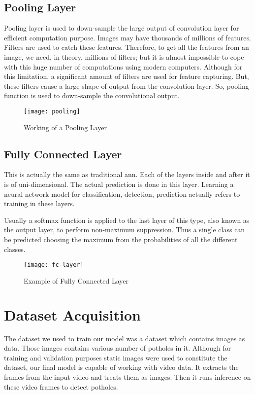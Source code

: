         \subsection{Pooling Layer}
            Pooling layer is used to down-sample the large output of convolution layer for efficient computation purpose. Images may have thousands of millions of features. Filters are used to catch these features. Therefore, to get all the features from an image, we need, in theory, millions of filters; but it is almost impossible to cope with this huge number of computations using modern computers. Although for this limitation, a significant amount of filters are used for feature capturing. But, these filters cause a large shape of output from the convolution layer. So, pooling function is used to down-sample the convolutional output.      
            \begin{figure}[h]
                \centering
                \texttt{[image: pooling]}
                \caption{Working of a Pooling Layer}
                \label{fig:pooling}
            \end{figure}
    
        \subsection{Fully Connected Layer}
            This is actually the same as traditional \acrfull{ann}. Each of the layers inside and after it is of uni-dimensional. The actual prediction is done in this layer. Learning a neural network model for classification, detection, prediction actually refers to training in these layers.
            
            Usually a softmax function is applied to the last layer of this type, also known as the output layer, to perform non-maximum suppression. Thus a single class can be predicted choosing the maximum from the probabilities of all the different classes.
            \begin{figure}[h]
                \centering
                \texttt{[image: fc-layer]}
                \caption{Example of Fully Connected Layer}
                \label{fig:fc-layer}
            \end{figure}
        
    \clearpage
    
    \section{Dataset Acquisition}
        The dataset we used to train our model was a dataset which contains images as data. Those images contains various number of potholes in it. Although for training and validation purposes static images were used to constitute the dataset, our final model is capable of working with video data. It extracts the frames from the input video and treats them as images. Then it runs inference on these video frames to detect potholes.
        
